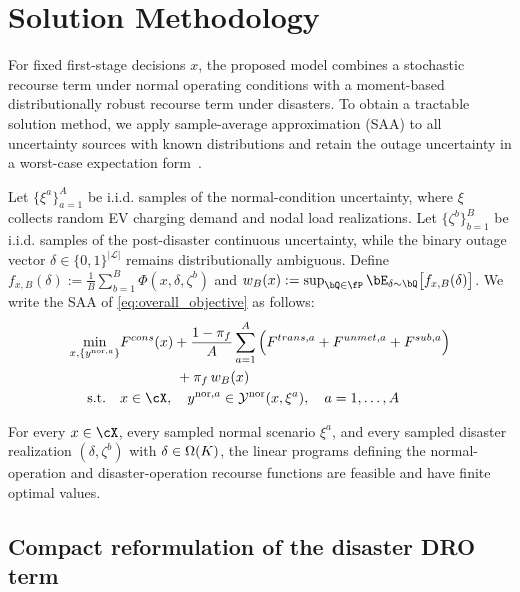 \section{Solution Methodology}
\label{sec:solution_methodology_compact}

\hspace*{0.7em}For fixed first-stage decisions $x$, the proposed model combines a stochastic recourse term under normal operating conditions with a moment-based distributionally robust recourse term under disasters. To obtain a tractable solution method, we apply sample-average approximation (SAA) to all uncertainty sources with known distributions and retain the outage uncertainty in a worst-case expectation form~\cite{liu2023stochasticTaxi}.

Let $\{\xi^a\}_{a=1}^A$ be i.i.d. samples of the normal-condition uncertainty, where $\xi$ collects random EV charging demand and nodal load realizations. Let $\{\zeta^b\}_{b=1}^B$ be i.i.d. samples of the post-disaster continuous uncertainty, while the binary outage vector $\delta\in\{0,1\}^{|\mathcal L|}$ remains distributionally ambiguous. Define \(
f_{x,B}(\delta):=\frac{1}{B}\sum_{b=1}^B \Phi(x,\delta,\zeta^b)
\) and \(w_B(x):=\sup_{\bQ \in\fP}\bE_{\delta\sim\bQ}\big[f_{x,B}(\delta)\big]\). We write the SAA of \eqref{eq:overall_objective} as follows:
\begin{equation}
\label{eq:overall_saa_compact}
\begin{aligned}
\min_{x,\{y^{{\rm nor},a}\}}
&F^{{cons}}(x)
+\frac{1-\pi_f}{A}\sum_{a=1}^A
\Big(F^{{trans},a}+F^{{unmet},a}+F^{{sub},a}\Big)\\
&\qquad \qquad +\pi_f\,w_B(x)\\
\text{s.t.}\quad
&x\in\cX,\quad y^{{\rm nor},a}\in\Ynor(x,\xi^a),\quad a=1,\dots,A
\end{aligned}
\end{equation}
\begin{assumption}
\label{ass:sg_wellposed}
For every $x\in\cX$, every sampled normal scenario $\xi^a$, and every sampled disaster realization $(\delta,\zeta^b)$ with $\delta\in\Omega(K)$, the linear programs defining the normal-operation and disaster-operation recourse functions are feasible and have finite optimal values.
\end{assumption}

\subsection{Compact reformulation of the disaster DRO term}
\label{subsec:compact_reformulation}

